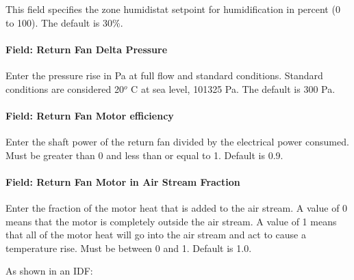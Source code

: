 This field specifies the zone humidistat setpoint for humidification in percent (0 to 100). The default is 30\%.

\paragraph{Field: Return Fan Delta Pressure}\label{field-return-fan-delta-pressure-1}

Enter the pressure rise in Pa at full flow and standard conditions. Standard conditions are considered 20\(^{o}\) C at sea level, 101325 Pa. The default is 300 Pa.

\paragraph{Field: Return Fan Motor efficiency}\label{field-return-fan-motor-efficiency-1}

Enter the shaft power of the return fan divided by the electrical power consumed. Must be greater than 0 and less than or equal to 1. Default is 0.9.

\paragraph{Field: Return Fan Motor in Air Stream Fraction}\label{field-return-fan-motor-in-air-stream-fraction-1}

Enter the fraction of the motor heat that is added to the air stream. A value of 0 means that the motor is completely outside the air stream. A value of 1 means that all of the motor heat will go into the air stream and act to cause a temperature rise. Must be between 0 and 1. Default is 1.0.

As shown in an IDF:

